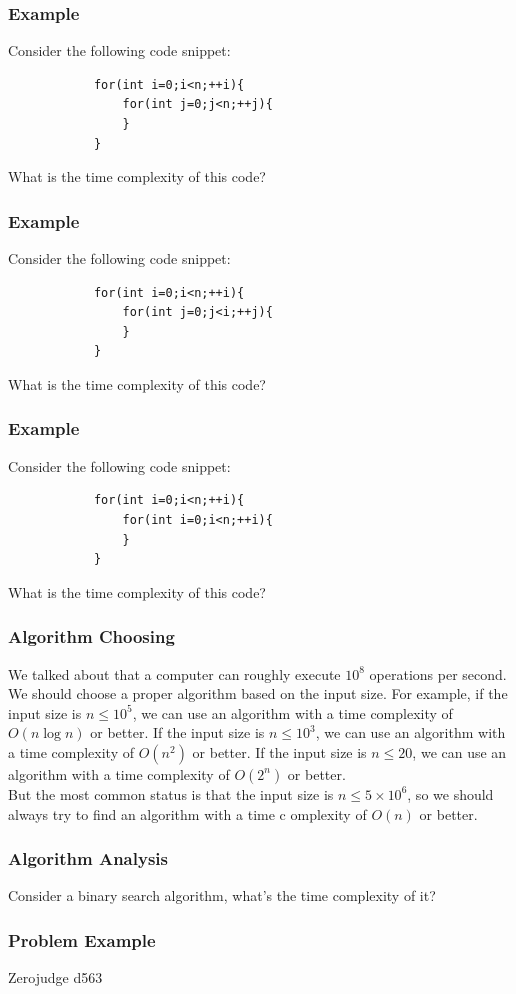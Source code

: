 \documentclass[xcolor=dvipsnames]{beamer}
\begin{document}
    \begin{frame}[fragile]
        \frametitle{Example}
        Consider the following code snippet:
        \begin{verbatim}
            for(int i=0;i<n;++i){
                for(int j=0;j<n;++j){
                }
            }
        \end{verbatim}
        What is the time complexity of this code?
    \end{frame}

    \begin{frame}[fragile]
        \frametitle{Example}
        Consider the following code snippet:
        \begin{verbatim}
            for(int i=0;i<n;++i){
                for(int j=0;j<i;++j){
                }
            }
        \end{verbatim}
        What is the time complexity of this code?
    \end{frame}

    \begin{frame}[fragile]
        \frametitle{Example}
        Consider the following code snippet:
        \begin{verbatim}
            for(int i=0;i<n;++i){
                for(int i=0;i<n;++i){
                }
            }
        \end{verbatim}
        What is the time complexity of this code?
    \end{frame}

    \begin{frame}
        \frametitle{Algorithm Choosing}
        We talked about that a computer can roughly execute $10^8$ operations per second. We should choose a proper algorithm based on the input size. For example, if the input size is $n \leq 10^5$, we can use an algorithm with a time complexity of $O(n \log n)$ or better. If the input size is $n \leq 10^3$, we can use an algorithm with a time complexity of $O(n^2)$ or better. If the input size is $n \leq 20$, we can use an algorithm with a time complexity of $O(2^n)$ or better.\\
        But the most common status is that the input size is $n \leq 5\times 10^6$, so we should always try to find an algorithm with a time c  omplexity of $O(n)$ or better.
    \end{frame}

    \begin{frame}
        \frametitle{Algorithm Analysis}
        Consider a binary search algorithm, what's the time complexity of it?
    \end{frame}

    \begin{frame}
        \frametitle{Problem Example}
        Zerojudge d563
    \end{frame}
\end{document}
